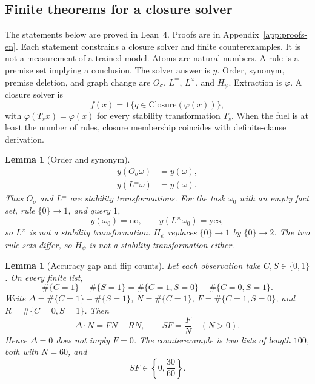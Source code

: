 \documentclass[11pt,a4paper]{article}
\theoremstyle{plain}
\newtheorem{lemma}[theorem]{Lemma}
\begin{document}
\subsection{Finite theorems for a closure solver}

The statements below are proved in Lean~4. Proofs are in
Appendix~\ref{app:proofs-en}. Each statement constrains a closure solver and
finite counterexamples. It is not a measurement of a trained model. Atoms are
natural numbers. A rule is a premise set implying a conclusion. The solver
answer is $y$. Order, synonym, premise deletion, and graph change are
$O_\sigma$, $L^{\equiv}$, $L^{\times}$, and $H_\psi$. Extraction is $\varphi$.
A closure solver is
\begin{equation}
f(x)=\mathbf{1}\{q\in\mathrm{Closure}(\varphi(x))\},
\end{equation}
with $\varphi(T_sx)=\varphi(x)$ for every stability transformation $T_s$.
When the fuel is at least the number of rules, closure membership coincides
with definite-clause derivation.

\begin{lemma}[Order and synonym]
\label{lem:order-en}
\begin{align}
y(O_\sigma\omega)&=y(\omega),\\
y(L^{\equiv}\omega)&=y(\omega).
\end{align}
Thus $O_\sigma$ and $L^{\equiv}$ are stability transformations. For the task
$\omega_0$ with an empty fact set, rule $\{0\}\to 1$, and query $1$,
\begin{equation}
y(\omega_0)=\mathrm{no},\qquad y(L^{\times}\omega_0)=\mathrm{yes},
\end{equation}
so $L^{\times}$ is not a stability transformation. $H_\psi$ replaces
$\{0\}\to 1$ by $\{0\}\to 2$. The two rule sets differ, so $H_\psi$ is not a
stability transformation either.
\end{lemma}

\begin{lemma}[Accuracy gap and flip counts]
\label{lem:gap-en}
Let each observation take $C,S\in\{0,1\}$. On every finite list,
\begin{equation}
\#\{C=1\}-\#\{S=1\}=\#\{C=1,S=0\}-\#\{C=0,S=1\}.
\end{equation}
Write $\Delta=\#\{C=1\}-\#\{S=1\}$, $N=\#\{C=1\}$,
$F=\#\{C=1,S=0\}$, and $R=\#\{C=0,S=1\}$. Then
\begin{equation}
\Delta\cdot N=FN-RN,
\qquad
SF=\frac{F}{N}\quad(N>0).
\end{equation}
Hence $\Delta=0$ does not imply $F=0$. The counterexample is two lists of
length $100$, both with $N=60$, and
\begin{equation}
SF\in\left\{0,\frac{30}{60}\right\}.
\end{equation}
\end{lemma}
\end{document}
